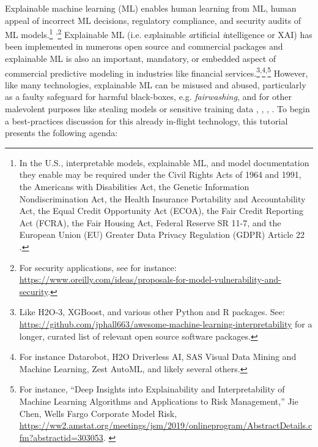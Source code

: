\documentclass[sigconf]{acmart}
\begin{document}
Explainable machine learning (ML) enables human learning from ML, human appeal of incorrect ML decisions, regulatory compliance, and security audits of ML models.\footnote{In the U.S., interpretable models, explainable ML, and model documentation they enable may be required under the Civil Rights Acts of 1964 and 1991, the Americans with Disabilities Act, the Genetic Information Nondiscrimination Act, the Health Insurance Portability and Accountability Act, the Equal Credit Opportunity Act (ECOA), the Fair Credit Reporting Act (FCRA), the Fair Housing Act, Federal Reserve SR 11-7, and the European Union (EU) Greater Data Privacy Regulation (GDPR) Article 22 \cite{ff_interpretability}.\label{fn:regs}} \textsuperscript{,}\footnote{For security applications, see for instance: \url{https://www.oreilly.com/ideas/proposals-for-model-vulnerability-and-security}.} Explainable ML (i.e. e\textit{x}plainable \textit{a}rtificial \textit{i}ntelligence or XAI) has been implemented in numerous open source and commercial packages and explainable ML is also an important, mandatory, or embedded aspect of commercial predictive modeling in industries like financial services.\footnote{Like H2O-3, XGBoost, and various other Python and R packages. See: \url{https://github.com/jphall663/awesome-machine-learning-interpretability} for a longer, curated list of relevant open source software packages.}\textsuperscript{,}\footnote{For instance  Datarobot, H2O Driverless AI, SAS Visual Data Mining and Machine Learning, Zest AutoML, and likely several others.}\textsuperscript{,}\footnote{For instance, ``Deep Insights into Explainability and Interpretability of Machine Learning Algorithms and Applications to Risk Management,'' Jie Chen, Wells Fargo Corporate Model Risk, \url{https://ww2.amstat.org/meetings/jsm/2019/onlineprogram/AbstractDetails.cfm?abstractid=303053}. \label{fn:Chen}} However, like many technologies, explainable ML can be misused and abused, particularly as a faulty safeguard for harmful black-boxes, e.g. \textit{fairwashing}, and for other malevolent purposes like stealing models or sensitive training data \cite{fair_washing}, \cite{please_stop}, \cite{membership_inference}, \cite{model_stealing}. To begin a best-practices discussion for this already in-flight technology, this tutorial presents the following agenda:\\
\end{document}
